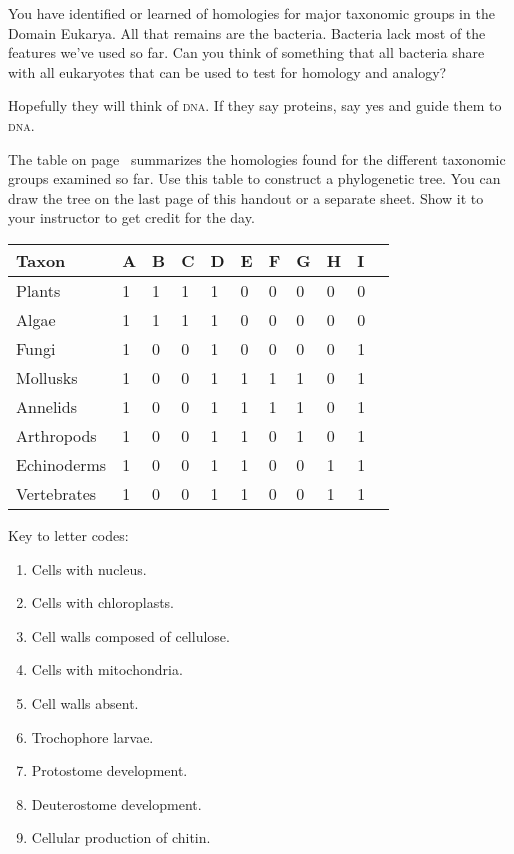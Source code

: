 \documentclass[12pt, hidelinks]{exam}
\newcommand*\AnswerBox[2]{%
    \parbox[t][#1]{0.92\textwidth}{%
    \begin{solution}#2\end{solution}}
    \vspace{\stretch{1}}
}
\begin{document}
\begin{questions}
\question[Checkout]
You have identified or learned of homologies for major taxonomic groups in the Domain Eukarya. All that remains are the bacteria. Bacteria lack most of the features we've used so far. Can you think of something that all bacteria share with all eukaryotes that can be used to test for homology and analogy?

\AnswerBox{2\baselineskip}{Hopefully they will think of \textsc{dna}. If they say proteins, say yes and guide them to \textsc{dna.}}

\question[Checkout]
The table on page~\pageref{presence_table} summarizes the homologies found for the different taxonomic groups examined so far. Use this table to construct a phylogenetic tree. You can draw the tree on the last page of this handout or a separate sheet. Show it to your instructor to get credit for the day.


\end{questions}

\newpage

\begin{longtable}{@{}L{1in}L{0.25in}L{0.25in}L{0.25in}L{0.25in}L{0.25in}L{0.25in}L{0.25in}L{0.25in}L{0.25in}L{0.25in}@{}}
\toprule
Taxon			& A	& B	& C	& D	& E	& F	& G	& H	& I	\tabularnewline
\midrule
Plants			& 1	& 1	& 1	& 1	& 0	& 0	& 0	& 0	& 0	\tabularnewline
Algae			& 1	& 1	& 1	& 1	& 0	& 0	& 0	& 0	& 0	\tabularnewline
Fungi			& 1	& 0	& 0	& 1	& 0	& 0	& 0	& 0	& 1	\tabularnewline
Mollusks		& 1	& 0	& 0	& 1	& 1	& 1	& 1	& 0	& 1	\tabularnewline
Annelids		& 1	& 0	& 0	& 1	& 1	& 1	& 1	& 0	& 1	\tabularnewline
Arthropods		& 1	& 0	& 0	& 1	& 1	& 0	& 1	& 0	& 1	\tabularnewline
Echinoderms		& 1	& 0	& 0	& 1	& 1	& 0	& 0	& 1	& 1	\tabularnewline
Vertebrates		& 1	& 0	& 0	& 1	& 1	& 0	& 0	& 1	& 1	\tabularnewline
\bottomrule
\end{longtable}\label{presence_table}

Key to letter codes:

\begin{multicols}{2}
	\raggedcolumns
	\begin{enumerate}
		\item Cells with nucleus.
		\item Cells with chloroplasts.
		\item Cell walls composed of cellulose.
		\item Cells with mitochondria.
		\item Cell walls absent.
		\item Trochophore larvae.
		\item Protostome development.
		\item Deuterostome development.
		\item Cellular production of chitin.
	\end{enumerate}
\end{multicols}
\end{document}
